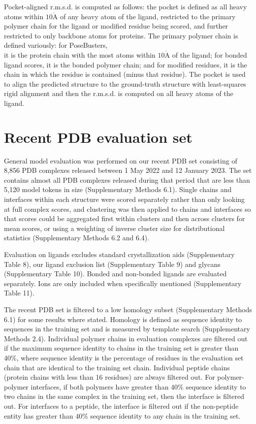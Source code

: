 \documentclass[10pt]{article}
\def\AA{\mathring{\mathrm{A}}}
\begin{document}
Pocket-aligned r.m.s.d. is computed as follows: the pocket is defined as all heavy atoms within $10 \AA$ of any heavy atom of the ligand, restricted to the primary polymer chain for the ligand or modified residue being scored, and further restricted to only backbone atoms for proteins. The primary polymer chain is defined variously: for PoseBusters,\\
it is the protein chain with the most atoms within $10 \AA$ of the ligand; for bonded ligand scores, it is the bonded polymer chain; and for modified residues, it is the chain in which the residue is contained (minus that residue). The pocket is used to align the predicted structure to the ground-truth structure with least-squares rigid alignment and then the r.m.s.d. is computed on all heavy atoms of the ligand.

\section*{Recent PDB evaluation set}
General model evaluation was performed on our recent PDB set consisting of 8,856 PDB complexes released between 1 May 2022 and 12 January 2023. The set contains almost all PDB complexes released during that period that are less than 5,120 model tokens in size (Supplementary Methods 6.1). Single chains and interfaces within each structure were scored separately rather than only looking at full complex scores, and clustering was then applied to chains and interfaces so that scores could be aggregated first within clusters and then across clusters for mean scores, or using a weighting of inverse cluster size for distributional statistics (Supplementary Methods 6.2 and 6.4).

Evaluation on ligands excludes standard crystallization aids (Supplementary Table 8), our ligand exclusion list (Supplementary Table 9) and glycans (Supplementary Table 10). Bonded and non-bonded ligands are evaluated separately. Ions are only included when specifically mentioned (Supplementary Table 11).

The recent PDB set is filtered to a low homology subset (Supplementary Methods 6.1) for some results where stated. Homology is defined as sequence identity to sequences in the training set and is measured by template search (Supplementary Methods 2.4). Individual polymer chains in evaluation complexes are filtered out if the maximum sequence identity to chains in the training set is greater than $40 \%$, where sequence identity is the percentage of residues in the evaluation set chain that are identical to the training set chain. Individual peptide chains (protein chains with less than 16 residues) are always filtered out. For polymer-polymer interfaces, if both polymers have greater than $40 \%$ sequence identity to two chains in the same complex in the training set, then the interface is filtered out. For interfaces to a peptide, the interface is filtered out if the non-peptide entity has greater than $40 \%$ sequence identity to any chain in the training set.
\end{document}
